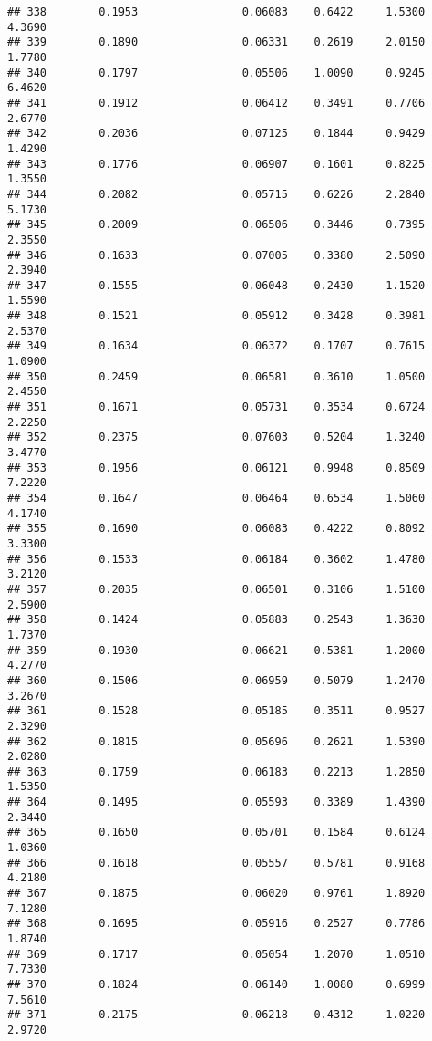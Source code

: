 \documentclass[
]{article}
\begin{document}
\begin{verbatim}
## 338        0.1953                0.06083    0.6422     1.5300       4.3690
## 339        0.1890                0.06331    0.2619     2.0150       1.7780
## 340        0.1797                0.05506    1.0090     0.9245       6.4620
## 341        0.1912                0.06412    0.3491     0.7706       2.6770
## 342        0.2036                0.07125    0.1844     0.9429       1.4290
## 343        0.1776                0.06907    0.1601     0.8225       1.3550
## 344        0.2082                0.05715    0.6226     2.2840       5.1730
## 345        0.2009                0.06506    0.3446     0.7395       2.3550
## 346        0.1633                0.07005    0.3380     2.5090       2.3940
## 347        0.1555                0.06048    0.2430     1.1520       1.5590
## 348        0.1521                0.05912    0.3428     0.3981       2.5370
## 349        0.1634                0.06372    0.1707     0.7615       1.0900
## 350        0.2459                0.06581    0.3610     1.0500       2.4550
## 351        0.1671                0.05731    0.3534     0.6724       2.2250
## 352        0.2375                0.07603    0.5204     1.3240       3.4770
## 353        0.1956                0.06121    0.9948     0.8509       7.2220
## 354        0.1647                0.06464    0.6534     1.5060       4.1740
## 355        0.1690                0.06083    0.4222     0.8092       3.3300
## 356        0.1533                0.06184    0.3602     1.4780       3.2120
## 357        0.2035                0.06501    0.3106     1.5100       2.5900
## 358        0.1424                0.05883    0.2543     1.3630       1.7370
## 359        0.1930                0.06621    0.5381     1.2000       4.2770
## 360        0.1506                0.06959    0.5079     1.2470       3.2670
## 361        0.1528                0.05185    0.3511     0.9527       2.3290
## 362        0.1815                0.05696    0.2621     1.5390       2.0280
## 363        0.1759                0.06183    0.2213     1.2850       1.5350
## 364        0.1495                0.05593    0.3389     1.4390       2.3440
## 365        0.1650                0.05701    0.1584     0.6124       1.0360
## 366        0.1618                0.05557    0.5781     0.9168       4.2180
## 367        0.1875                0.06020    0.9761     1.8920       7.1280
## 368        0.1695                0.05916    0.2527     0.7786       1.8740
## 369        0.1717                0.05054    1.2070     1.0510       7.7330
## 370        0.1824                0.06140    1.0080     0.6999       7.5610
## 371        0.2175                0.06218    0.4312     1.0220       2.9720

\end{verbatim}
\end{document}
